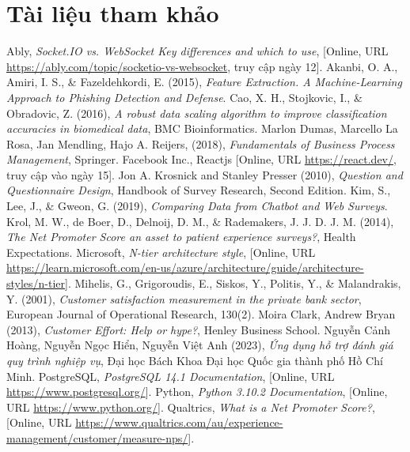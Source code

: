 \section{Tài liệu tham khảo}
\begin{thebibliography}{9}
     Ably, \textit{Socket.IO vs. WebSocket\: Key differences and which to use}, [Online, URL\: \url{https://ably.com/topic/socketio-vs-websocket}, truy cập ngày 12].
     Akanbi, O. A., Amiri, I. S., \& Fazeldehkordi, E. (2015), \textit{Feature Extraction. A Machine-Learning Approach to Phishing Detection and Defense}.
     Cao, X. H., Stojkovic, I., \& Obradovic, Z. (2016), \textit{A robust data scaling algorithm to improve classification accuracies in biomedical data}, BMC Bioinformatics.
     Marlon Dumas, Marcello La Rosa, Jan Mendling, Hajo A. Reijers, (2018), \textit{Fundamentals of Business Process Management}, Springer.
     Facebook Inc., Reactjs [Online, URL\: \url{https://react.dev/}, truy cập vào ngày 15].
     Jon A. Krosnick and Stanley Presser (2010), \textit{Question and Questionnaire Design}, Handbook of Survey Research, Second Edition.
     Kim, S., Lee, J., \& Gweon, G. (2019), \textit{Comparing Data from Chatbot and Web Surveys}.
     Krol, M. W., de Boer, D., Delnoij, D. M., \& Rademakers, J. J. D. J. M. (2014), \textit{The Net Promoter Score \- an asset to patient experience surveys?}, Health Expectations.
     Microsoft, \textit{N-tier architecture style}, [Online, URL\: \url{https://learn.microsoft.com/en-us/azure/architecture/guide/architecture-styles/n-tier}].
     Mihelis, G., Grigoroudis, E., Siskos, Y., Politis, Y., \& Malandrakis, Y. (2001), \textit{Customer satisfaction measurement in the private bank sector}, European Journal of Operational Research, 130(2).
     Moira Clark, Andrew Bryan (2013), \textit{Customer Effort: Help or hype?}, Henley Business School.
     Nguyễn Cảnh Hoàng, Nguyễn Ngọc Hiển, Nguyễn Việt Anh (2023), \textit{Ứng dụng hỗ trợ đánh giá quy trình nghiệp vụ}, Đại học Bách Khoa Đại học Quốc gia thành phố Hồ Chí Minh.
     PostgreSQL, \textit{PostgreSQL 14.1 Documentation}, [Online, URL\: \url{https://www.postgresql.org/}].
     Python, \textit{Python 3.10.2 Documentation}, [Online, URL\: \url{https://www.python.org/}].
     Qualtrics, \textit{What is a Net Promoter Score?}, [Online, URL\: \url{https://www.qualtrics.com/au/experience-management/customer/measure-nps/}].

\end{thebibliography}
